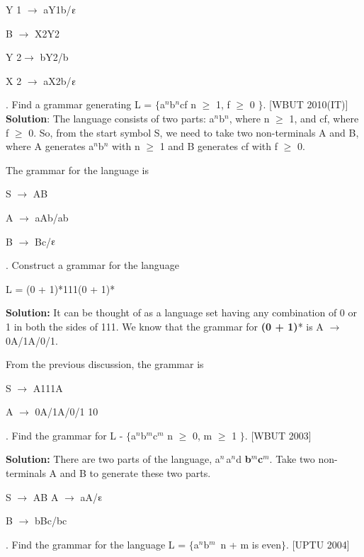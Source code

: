 \documentclass{article} %
\begin{document}
\noindent Y 1 $\mathrm{\to}$ aY1b/$\varepsilonup$

\noindent  B $\mathrm{\to}$ X2Y2

\noindent  Y 2$\mathrm{\to}$ bY2/b

\noindent X 2 $\mathrm{\to}$ aX2b/$\varepsilonup$

. Find a grammar generating L = $\mathrm{\{}$a${}^{n}$b${}^{n}$cf {\textbar} n $\mathrm{\ge}$ 1, f $\mathrm{\ge}$ 0 $\mathrm{\}}$.                                               [WBUT 2010(IT)] \textbf{Solution}: The language consists of two parts: a${}^{n}$b${}^{n}$, where n $\mathrm{\ge}$ 1, and cf, where f $\mathrm{\ge}$ 0. So, from the start symbol S, we need to take two non-terminals A and B, where A generates a${}^{n}$b${}^{n}$ with n $\mathrm{\ge}$ 1 and B generates cf with f $\mathrm{\ge}$ 0. 

\noindent The grammar for the language is

\noindent S $\mathrm{\to}$ AB

\noindent  A $\mathrm{\to}$ aAb/ab 

\noindent B $\mathrm{\to}$ Bc/$\varepsilonup$ 

. Construct a grammar for the language 

\noindent L = (0 + 1)*111(0 + 1)*

\noindent \textbf{Solution: }It can be thought of as a language set having any combination of 0 or 1 in both the sides of 111. We know that the grammar for \textbf{(0 + 1)}* is A $\mathrm{\to}$ 0A/1A/0/1. 

\noindent From the previous discussion, the grammar is 

\noindent S $\mathrm{\to}$ A111A 

\noindent A $\mathrm{\to}$ 0A/1A/0/1 10

\noindent . Find the grammar for   L - $\mathrm{\{}$a${}^{n}$b${}^{m}$c${}^{m}$ {\textbar} n $\mathrm{\ge}$ 0, m $\mathrm{\ge}$ 1 $\mathrm{\}}$.                                                         [WBUT 2003]

\noindent \textbf{Solution:} There are two parts of the language, a${}^{n\ }$a${}^{n}$d \textbf{b${}^{m}$c${}^{m}$}. Take two non-terminals A and B to generate these two parts.

\noindent S $\mathrm{\to}$ AB A $\mathrm{\to}$ aA/$\varepsilonup$ 

\noindent B $\mathrm{\to}$ bBc/bc 

. Find the grammar for the language L = $\mathrm{\{}$a${}^{n}$b${}^{m\ }${\textbar} n + m is even$\mathrm{\}}$.                                     [UPTU 2004]
\end{document}
